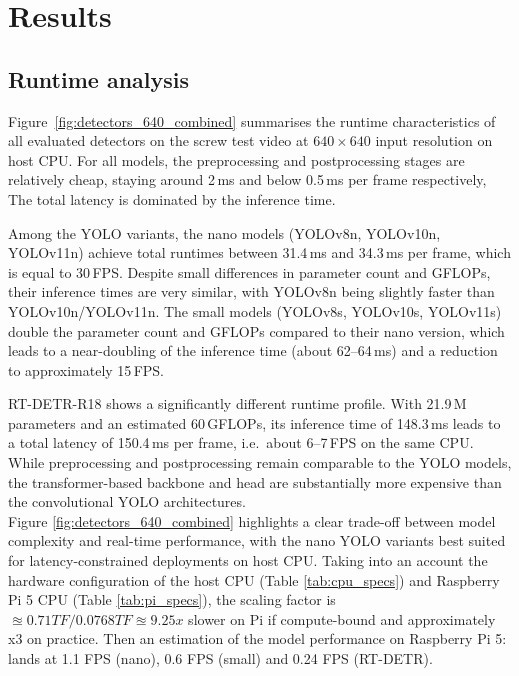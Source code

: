 \documentclass[12pt,a4paper]{report}
\begin{document}
\section{Results}

\subsection{Runtime analysis}

Figure~\ref{fig:detectors_640_combined} summarises the runtime characteristics of all evaluated detectors
on the screw test video at $640\times640$ input resolution on host CPU. For all models, the preprocessing
and postprocessing stages are relatively cheap, staying around 2\,ms and below 0.5\,ms per frame
respectively, The total latency is dominated by the inference time.

Among the YOLO variants, the nano models (YOLOv8n, YOLOv10n, YOLOv11n) achieve total runtimes between
31.4\,ms and 34.3\,ms per frame, which is equal to 30\,FPS. Despite small differences
in parameter count and GFLOPs, their inference times are very similar, with YOLOv8n being slightly
faster than YOLOv10n/YOLOv11n. The small models (YOLOv8s, YOLOv10s, YOLOv11s) double the parameter
count and GFLOPs compared to their nano version, which leads to a near-doubling of the inference
time (about 62–64\,ms) and a reduction to approximately 15\,FPS.

RT-DETR-R18 shows a significantly different runtime profile. With 21.9\,M parameters and an estimated
60\,GFLOPs, its inference time of 148.3\,ms leads to a total latency of 150.4\,ms per frame,
i.e.\ about 6–7\,FPS on the same CPU. While preprocessing and postprocessing remain comparable
to the YOLO models, the transformer-based backbone and head are substantially more expensive
than the convolutional YOLO architectures. \\

Figure \ref{fig:detectors_640_combined} highlights a clear trade-off between model complexity and real-time performance,
with the nano YOLO variants best suited for latency-constrained deployments on host CPU. Taking into an account
the hardware configuration of the host CPU (Table \ref{tab:cpu_specs}) and Raspberry Pi 5 CPU (Table \ref{tab:pi_specs}),
the scaling factor is $\approxeq 0.71 TF / 0.0768 TF \approxeq 9.25x$ slower on Pi if compute-bound and
approximately x3 on practice.
Then an estimation of the model performance on Raspberry Pi 5: lands at 1.1 FPS (nano), 0.6 FPS (small)
and 0.24 FPS (RT-DETR).
\end{document}
